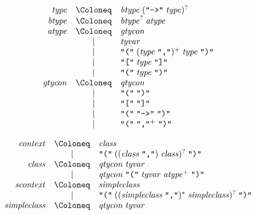 \begin{align*}
  \begin{array}{rcl}
    \mathit{type}
    & \Coloneq & \mathit{btype}\; (\text{\texttt{\textquotedbl ->\textquotedbl}}\; \mathit{type})^? \\
    \mathit{btype}
    & \Coloneq & \mathit{btype}^?\; \mathit{atype} \\
    \mathit{atype}
    & \Coloneq & \mathit{gtycon} \\
    & \mid & \mathit{tyvar} \\
    & \mid & \text{\texttt{\textquotedbl(\textquotedbl}}\; (\mathit{type}\; \text{\texttt{\textquotedbl,\textquotedbl}})^+\; \mathit{type}\; \text{\texttt{\textquotedbl)\textquotedbl}} \\
    & \mid & \text{\texttt{\textquotedbl[\textquotedbl}}\; \mathit{type}\; \text{\texttt{\textquotedbl]\textquotedbl}} \\
    & \mid & \text{\texttt{\textquotedbl(\textquotedbl}}\; \mathit{type}\; \text{\texttt{\textquotedbl)\textquotedbl}} \\
    \mathit{gtycon}
    & \Coloneq & \mathit{qtycon} \\
    & \mid & \text{\texttt{\textquotedbl(\textquotedbl}}\; \text{\texttt{\textquotedbl)\textquotedbl}} \\
    & \mid & \text{\texttt{\textquotedbl[\textquotedbl}}\; \text{\texttt{\textquotedbl]\textquotedbl}} \\
    & \mid & \text{\texttt{\textquotedbl(\textquotedbl}}\; \text{\texttt{\textquotedbl ->\textquotedbl}}\; \text{\texttt{\textquotedbl)\textquotedbl}} \\
    & \mid & \text{\texttt{\textquotedbl(\textquotedbl}}\; \text{\texttt{\textquotedbl,\textquotedbl}}^+\; \text{\texttt{\textquotedbl)\textquotedbl}}
  \end{array}
\end{align*}

\begin{align*}
  \begin{array}{rcl}
    \mathit{context}
    & \Coloneq & \mathit{class} \\
    & \mid & \text{\texttt{\textquotedbl(\textquotedbl}}\; ((\mathit{class}\; \text{\texttt{\textquotedbl,\textquotedbl}})\; \mathit{class})^?\; \text{\texttt{\textquotedbl)\textquotedbl}}
    \\
    \mathit{class}
    & \Coloneq & \mathit{qtycon}\; \mathit{tyvar} \\
    & \mid & \mathit{qtycon}\; \text{\texttt{\textquotedbl(\textquotedbl}}\; \mathit{tyvar}\; \mathit{atype}^+\; \text{\texttt{\textquotedbl)\textquotedbl}} \\
    \mathit{scontext}
    & \Coloneq & \mathit{simpleclass} \\
    & \mid & \text{\texttt{\textquotedbl(\textquotedbl}}\; ((\mathit{simpleclass}\; \text{\texttt{\textquotedbl,\textquotedbl}})^*\; \mathit{simpleclass})^?\; \text{\texttt{\textquotedbl)\textquotedbl}}
    \\
    \mathit{simpleclass}
    & \Coloneq & \mathit{qtycon}\; \mathit{tyvar}
  \end{array}
\end{align*}

